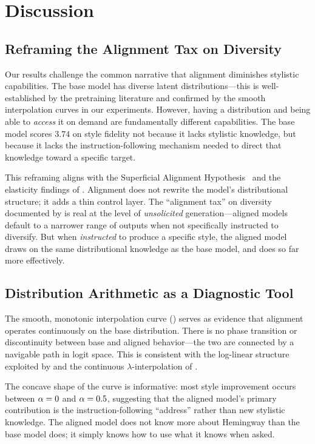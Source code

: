 \section{Discussion}
\label{sec:discussion}

\subsection{Reframing the Alignment Tax on Diversity}
\label{sec:reframing}

Our results challenge the common narrative that alignment diminishes stylistic
capabilities. The base model has diverse latent distributions---this is
well-established by the pretraining literature and confirmed by the smooth
interpolation curves in our experiments. However, having a distribution and
being able to \emph{access} it on demand are fundamentally different
capabilities. The base model scores $3.74$ on style fidelity not because it
lacks stylistic knowledge, but because it lacks the instruction-following
mechanism needed to direct that knowledge toward a specific target.

This reframing aligns with the Superficial Alignment Hypothesis~\cite{zhou2023lima}
and the elasticity findings of \citet{ji2024resistance}. Alignment does not
rewrite the model's distributional structure; it adds a thin control layer.
The ``alignment tax'' on diversity documented by \citet{kirk2023rlhf} is real at
the level of \emph{unsolicited} generation---aligned models default to a narrower
range of outputs when not specifically instructed to diversify. But when
\emph{instructed} to produce a specific style, the aligned model draws on the same
distributional knowledge as the base model, and does so far more effectively.

\subsection{Distribution Arithmetic as a Diagnostic Tool}
\label{sec:diagnostic}

The smooth, monotonic interpolation curve () serves as
evidence that alignment operates continuously on the base distribution. There is
no phase transition or discontinuity between base and aligned behavior---the two
are connected by a navigable path in logit space. This is consistent with the
log-linear structure exploited by \citet{zhou2024emulated} and the
continuous $\lambda$-interpolation of \citet{zhu2025adding}.

The concave shape of the curve is informative: most style improvement occurs
between $\alpha = 0$ and $\alpha = 0.5$, suggesting that the aligned
model's primary contribution is the instruction-following ``address'' rather than
new stylistic knowledge. The aligned model does not know more about Hemingway than
the base model does; it simply knows how to use what it knows when asked.

